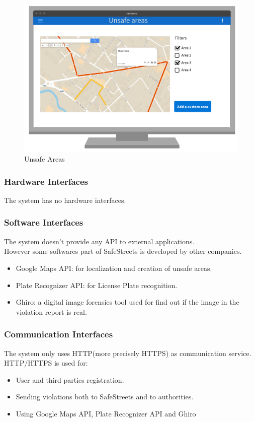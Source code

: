 \documentclass{article}
\begin{document}
\begin{figure}[H]
    \centering
    \includegraphics[scale=0.35]{Images/WEBUnsafeAreas}
    \caption{Unsafe Areas}
\end{figure}
\newpage
\newpage
\subsubsection{Hardware Interfaces}
The system has no hardware interfaces.
\subsubsection{Software Interfaces}
The system doesn't provide any API to external applications.\\
However some softwares part of SafeStreets is developed by other companies.
\begin{itemize}
    \item Google Maps API: for localization and creation of unsafe areas.
    \item Plate Recognizer API: for License Plate recognition.
    \item Ghiro: a digital image forensics tool used for find out if the image
    in the violation report is real.
\end{itemize}
\subsubsection{Communication Interfaces}
The system only uses HTTP(more precisely HTTPS) as communication service.
HTTP/HTTPS is used for:
\begin{itemize}
    \item User and third parties registration.
    \item Sending violations both to SafeStreets and to authorities.
    \item Using Google Maps API, Plate Recognizer API and Ghiro
\end{itemize}
\end{document}
